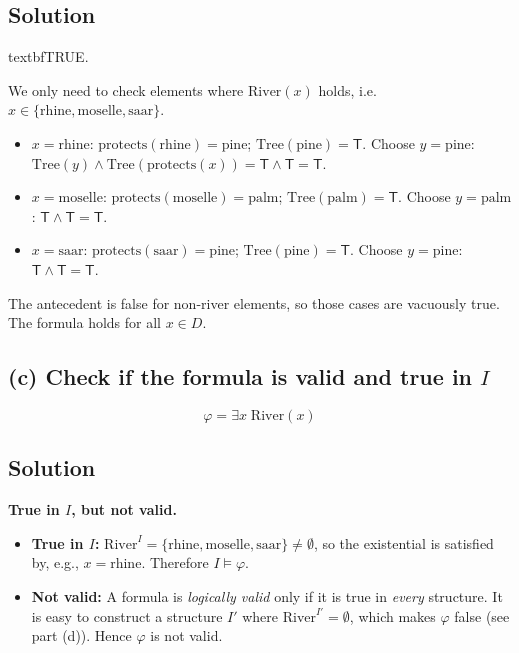 \documentclass[11pt,a4paper]{article}
\newenvironment{solution}{%
    \begin{tcolorbox}[
        breakable,
        colback=green!4,
        colframe=green!50!black,
        fonttitle=\bfseries,
        title={ Solution},
        left=6pt, right=6pt, top=4pt, bottom=4pt
    ]%
    }{%
    \end{tcolorbox}%
}
\begin{document}
    \subsection*{Solution}
    \begin{solution}
        textbf{TRUE.}

        We only need to check elements where $\mathrm{River}(x)$ holds, i.e.\ $x \in \{\text{rhine},\text{moselle},\text{saar}\}$.

        \begin{itemize}
            \item $x = \text{rhine}$: $\mathrm{protects}(\text{rhine}) = \text{pine}$; $\mathrm{Tree}(\text{pine}) = \mathsf{T}$.
            Choose $y = \text{pine}$: $\mathrm{Tree}(y) \land \mathrm{Tree}(\mathrm{protects}(x)) = \mathsf{T} \land \mathsf{T} = \mathsf{T}$. \checkmark
            \item $x = \text{moselle}$: $\mathrm{protects}(\text{moselle}) = \text{palm}$; $\mathrm{Tree}(\text{palm}) = \mathsf{T}$.
            Choose $y = \text{palm}$: $\mathsf{T} \land \mathsf{T} = \mathsf{T}$. \checkmark
            \item $x = \text{saar}$: $\mathrm{protects}(\text{saar}) = \text{pine}$; $\mathrm{Tree}(\text{pine}) = \mathsf{T}$.
            Choose $y = \text{pine}$: $\mathsf{T} \land \mathsf{T} = \mathsf{T}$. \checkmark
        \end{itemize}

        The antecedent is false for non-river elements, so those cases are vacuously true. The formula holds for all $x \in D$.
    \end{solution}

    \subsection*{(c) Check if the formula is valid and true in $I$}
    \[
        \varphi = \exists x\;\mathrm{River}(x)
    \]

    \subsection*{Solution}
    \begin{solution}
        \textbf{True in $I$, but not valid.}

        \begin{itemize}
            \item \textbf{True in $I$:} $\mathrm{River}^I = \{\text{rhine},\text{moselle},\text{saar}\} \neq \emptyset$, so the existential is satisfied by, e.g., $x = \text{rhine}$. Therefore $I \models \varphi$.
            \item \textbf{Not valid:} A formula is \emph{logically valid} only if it is true in \emph{every} structure. It is easy to construct a structure $I'$ where $\mathrm{River}^{I'} = \emptyset$, which makes $\varphi$ false (see part (d)). Hence $\varphi$ is not valid.
        \end{itemize}
    \end{solution}
\end{document}
